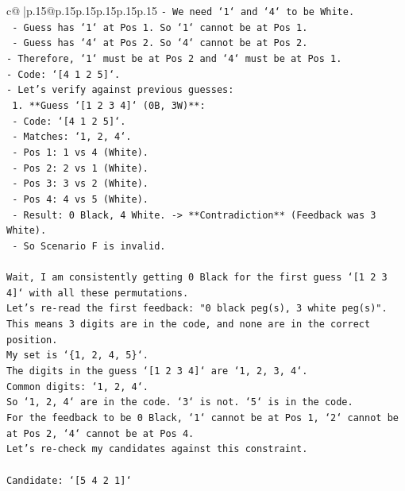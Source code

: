 \documentclass{article}
\begin{document}
{\begin{supertabular}{c@{$\;$}|p{.15\linewidth}@{}p{.15\linewidth}p{.15\linewidth}p{.15\linewidth}p{.15\linewidth}p{.15\linewidth}}
{{{\texttt{{-} We need `1` and `4` to be White.} \\
\texttt{    {-} Guess has `1` at Pos 1. So `1` cannot be at Pos 1.} \\
\texttt{    {-} Guess has `4` at Pos 2. So `4` cannot be at Pos 2.} \\
\texttt{{-} Therefore, `1` must be at Pos 2 and `4` must be at Pos 1.} \\
\texttt{{-} Code: `{[}4 1 2 5{]}`.} \\
\texttt{{-} Let's verify against previous guesses:} \\
\texttt{    1.  **Guess `{[}1 2 3 4{]}` (0B, 3W)**:} \\
\texttt{        {-} Code: `{[}4 1 2 5{]}`.} \\
\texttt{        {-} Matches: `1, 2, 4`.} \\
\texttt{        {-} Pos 1: 1 vs 4 (White).} \\
\texttt{        {-} Pos 2: 2 vs 1 (White).} \\
\texttt{        {-} Pos 3: 3 vs 2 (White).} \\
\texttt{        {-} Pos 4: 4 vs 5 (White).} \\
\texttt{        {-} Result: 0 Black, 4 White. {-}> **Contradiction** (Feedback was 3 White).} \\
\texttt{    {-} So Scenario F is invalid.} \\
\\ 
\texttt{Wait, I am consistently getting 0 Black for the first guess `{[}1 2 3 4{]}` with all these permutations.} \\
\texttt{Let's re{-}read the first feedback: "0 black peg(s), 3 white peg(s)".} \\
\texttt{This means 3 digits are in the code, and none are in the correct position.} \\
\texttt{My set is `\{1, 2, 4, 5\}`.} \\
\texttt{The digits in the guess `{[}1 2 3 4{]}` are `1, 2, 3, 4`.} \\
\texttt{Common digits: `1, 2, 4`.} \\
\texttt{So `1, 2, 4` are in the code. `3` is not. `5` is in the code.} \\
\texttt{For the feedback to be 0 Black, `1` cannot be at Pos 1, `2` cannot be at Pos 2, `4` cannot be at Pos 4.} \\
\texttt{Let's re{-}check my candidates against this constraint.} \\
\\ 
\texttt{Candidate: `{[}5 4 2 1{]}`} \\
}}}
\end{supertabular}}
\end{document}
